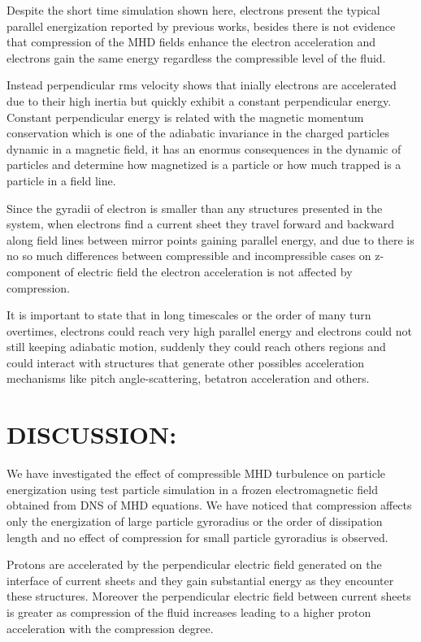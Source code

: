 \documentclass[%
aip,pop,amsmath,amssymb,
 reprint,%
]{revtex4-1}
\begin{document}
Despite the short time simulation shown here, electrons present the typical parallel
energization reported by previous works, besides there is not evidence that compression of 
the MHD fields enhance the electron acceleration and electrons gain the same energy
regardless the compressible level of the fluid.

Instead perpendicular rms velocity shows that inially electrons are accelerated due to
their high inertia but quickly exhibit a constant perpendicular energy. Constant 
perpendicular energy is related with the magnetic momentum conservation which 
is one of the adiabatic invariance in the charged particles dynamic in a magnetic 
field, it has an enormus consequences in the dynamic of particles and determine how 
magnetized is a particle or how much trapped is a particle in a field line.

Since the gyradii of electron is smaller than any structures presented 
in the system, when electrons find a current sheet they travel forward and backward along
field lines between mirror points gaining parallel energy, and due to there is no so much 
differences between compressible and incompressible cases on z-component of electric field
the electron acceleration is not affected by compression.

It is important to state that in long timescales or the order of many turn overtimes, 
electrons could reach very high parallel energy and electrons could not still keeping 
adiabatic motion, suddenly they could reach others regions and could interact with 
structures that generate other possibles acceleration mechanisms like pitch 
angle-scattering, betatron acceleration and others.

\section{\label{sec:level4}DISCUSSION:}
We have investigated the effect of compressible MHD turbulence on particle energization 
using test particle simulation in a frozen electromagnetic field obtained from DNS of MHD
equations. We have noticed that compression affects only the energization of large particle
gyroradius or the order of dissipation length and no effect of compression for
small particle gyroradius is observed. 

Protons are accelerated by the perpendicular electric field generated on the interface of
current sheets and they gain substantial energy as they encounter these structures. 
Moreover the perpendicular electric field between current sheets is greater as compression
of the fluid increases leading to a higher proton acceleration with the compression degree.
\end{document}
